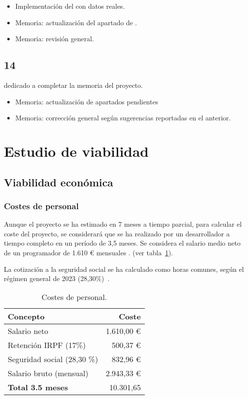 \begin{itemize}
	\item Implementación del  con datos reales. 
	\item Memoria: actualización del apartado de . 
	\item Memoria: revisión general. 
\end{itemize}


\subsection{ 14}

 dedicado a completar la memoria del proyecto. 

\begin{itemize}
	\item Memoria: actualización de apartados pendientes
	\item Memoria: corrección general según sugerencias reportadas en el  anterior. 
\end{itemize}

\newpage
\section{Estudio de viabilidad}

\subsection{Viabilidad económica}
\subsubsection{Costes de personal}
Aunque el proyecto se ha estimado en 7 meses a tiempo parcial, para calcular el coste del proyecto, se 
considerará que se ha realizado por un desarrollador a tiempo completo en un período de 3,5 meses. 
Se considera el salario medio neto de un programador de 1.610 € mensuales \cite{salario}.
(ver tabla~\ref{tab:personal}).

La cotización a la seguridad social se ha calculado como horas comunes, según
el régimen general de 2023 (28,30\%)~\cite{seguridad-social}.

\begin{table}[!h]
	\centering
	\begin{tabular}{lr}
		\toprule
		\textbf{Concepto} & \textbf{Coste} \\
		\midrule
		Salario neto & 1.610,00 €\\
		Retención IRPF (17\%) & 500,37 € \\
		Seguridad social (28,30 \%) & 832,96 € \\
		\midrule
		Salario bruto (mensual) & 2.943,33 € \\
		\midrule
		\textbf{Total 3.5 meses} & 10.301,65 \\
		\bottomrule
	\end{tabular}
	\caption{Costes de personal.}
	\label{tab:personal}
\end{table}

